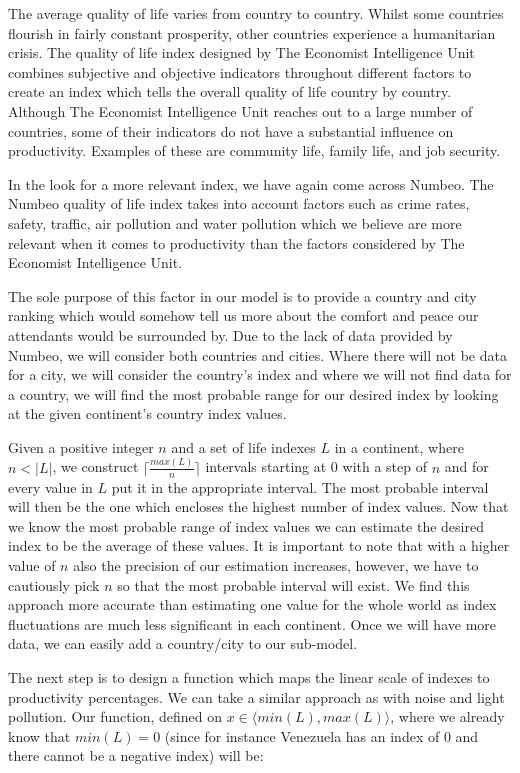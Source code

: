 The average quality of life varies from country to country. Whilst some countries flourish in fairly constant prosperity, other countries experience a humanitarian crisis. The quality of life index designed by The Economist Intelligence Unit combines subjective and objective indicators throughout different factors to create an index which tells the overall quality of life country by country. Although The Economist Intelligence Unit reaches out to a large number of countries, some of their indicators do not have a substantial influence on productivity. Examples of these are community life, family life, and job security. 

In the look for a more relevant index, we have again come across Numbeo. The Numbeo quality of life index takes into account factors such as crime rates, safety, traffic, air pollution and water pollution which we believe are more relevant when it comes to productivity than the factors considered by The Economist Intelligence Unit. 

The sole purpose of this factor in our model is to provide a country and city ranking which would somehow tell us more about the comfort and peace our attendants would be surrounded by. Due to the lack of data provided by Numbeo, we will consider both countries and cities. Where there will not be data for a city, we will consider the country's index and where we will not find data for a country, we will find the most probable range for our desired index by looking at the given continent's country index values.

Given a positive integer $n$ and a set of life indexes $L$ in a continent, where $n < |L|$, we construct $ \lceil \frac{max(L)}{n}\rceil$ intervals starting at 0 with a step of $n$ and for every value in $L$ put it in the appropriate interval. The most probable interval will then be the one which encloses the highest number of index values. Now that we know the most probable range of index values we can estimate the desired index to be the average of these values. It is important to note that with a higher value of $n$ also the precision of our estimation increases, however, we have to cautiously pick $n$ so that the most probable interval will exist. We find this approach more accurate than estimating one value for the whole world as index fluctuations are much less significant in each continent. Once we will have more data, we can easily add a country/city to our sub-model.

The next step is to design a function which maps the linear scale of indexes to productivity percentages. We can take a similar approach as with noise and light pollution. Our function, defined on  $ x\in \langle min(L),max(L)\rangle$, where we already know that $min(L) = 0$ (since for instance Venezuela has an index of 0 and there cannot be a negative index) will be:

